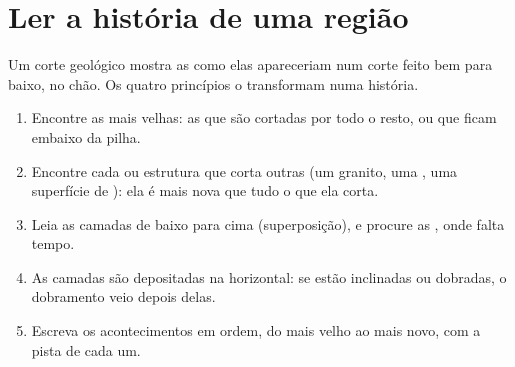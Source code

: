 \section{Ler a história de uma região}

Um corte geológico mostra as  como elas apareceriam num corte feito
bem para baixo, no chão. Os quatro princípios o transformam numa história.

\begin{method}\label{met:g7:geological-time:ordering}
\begin{enumerate}
  \item Encontre as  mais velhas: as que são cortadas por todo o
        resto, ou que ficam embaixo da pilha.
  \item Encontre cada  ou estrutura que corta outras (um granito,
        uma , uma superfície de ): ela é mais nova que tudo o
        que ela corta.
  \item Leia as camadas de baixo para cima (superposição), e procure as
        , onde falta tempo.
  \item As camadas são depositadas na horizontal: se estão inclinadas ou
        dobradas, o dobramento veio depois delas.
  \item Escreva os acontecimentos em ordem, do mais velho ao mais novo,
        com a pista de cada um.
\end{enumerate}
\end{method}

